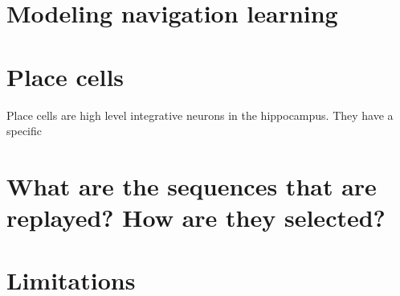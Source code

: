\documentclass[]{article}
\begin{document}
\section{Modeling navigation
learning}\label{modeling-navigation-learning}

\section{Place cells}\label{place-cells}
Place cells are high level integrative neurons in the hippocampus. They have a specific

\section{What are the sequences that are replayed? How are they
selected?}\label{what-are-the-sequences-that-are-replayed-how-are-they-selected}

\section{Limitations}\label{limitations}




\end{document}
